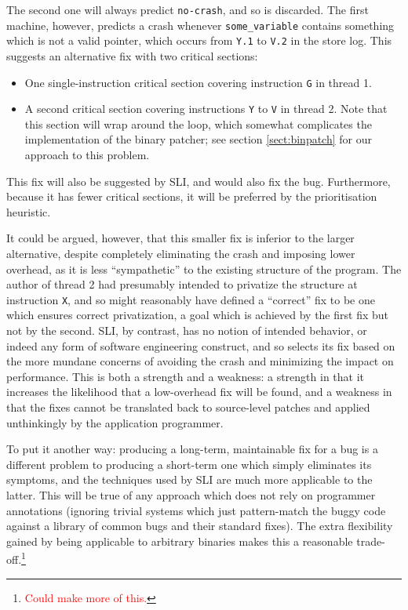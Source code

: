 \documentclass[10pt,twocolumn,preprint,natbib,authoryear]{sigplanconf}
\newcommand{\editorial}[1]{\textcolor{red}{\footnote{\textcolor{red}{#1}}}}
\begin{document}
The second one will always predict \verb|no-crash|, and so is
discarded.  The first machine, however, predicts a crash whenever
\verb|some_variable| contains something which is not a valid pointer,
which occurs from \verb|Y.1| to \verb|V.2| in the store log.  This
suggests an alternative fix with two critical sections:

\begin{itemize}
\item One single-instruction critical section covering instruction
  \verb|G| in thread 1.
\item A second critical section covering instructions \verb|Y| to
  \verb|V| in thread 2.  Note that this section will wrap around the
  loop, which somewhat complicates the implementation of the binary
  patcher; see section \ref{sect:binpatch} for our approach to this
  problem.
\end{itemize}

This fix will also be suggested by SLI, and would also fix the bug.
Furthermore, because it has fewer critical sections, it will be
preferred by the prioritisation heuristic.

It could be argued, however, that this smaller fix is inferior to the
larger alternative, despite completely eliminating the crash and
imposing lower overhead, as it is less ``sympathetic'' to the existing
structure of the program.  The author of thread 2 had presumably
intended to privatize the structure at instruction \verb|X|, and so
might reasonably have defined a ``correct'' fix to be one which
ensures correct privatization, a goal which is achieved by the first
fix but not by the second.  SLI, by contrast, has no notion of
intended behavior, or indeed any form of software engineering
construct, and so selects its fix based on the more mundane concerns
of avoiding the crash and minimizing the impact on performance.  This
is both a strength and a weakness: a strength in that it increases the
likelihood that a low-overhead fix will be found, and a weakness in
that the fixes cannot be translated back to source-level patches and
applied unthinkingly by the application programmer.

To put it another way: producing a long-term, maintainable fix for a
bug is a different problem to producing a short-term one which simply
eliminates its symptoms, and the techniques used by SLI are much more
applicable to the latter.  This will be true of any approach which
does not rely on programmer annotations (ignoring trivial systems
which just pattern-match the buggy code against a library of common
bugs and their standard fixes).  The extra flexibility gained by being
applicable to arbitrary binaries makes this a reasonable
trade-off.\editorial{Could make more of this.}
\end{document}
